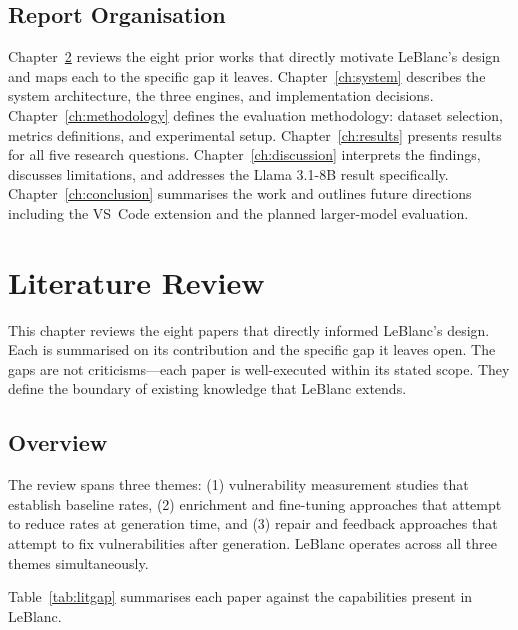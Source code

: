 \documentclass[12pt,a4paper]{report}
\begin{document}
\section{Report Organisation}
\label{sec:organisation}

Chapter~\ref{ch:literature} reviews the eight prior works that directly motivate
LeBlanc's design and maps each to the specific gap it leaves.
Chapter~\ref{ch:system} describes the system architecture, the three engines, and
implementation decisions.
Chapter~\ref{ch:methodology} defines the evaluation methodology: dataset
selection, metrics definitions, and experimental setup.
Chapter~\ref{ch:results} presents results for all five research questions.
Chapter~\ref{ch:discussion} interprets the findings, discusses limitations, and
addresses the Llama 3.1-8B result specifically.
Chapter~\ref{ch:conclusion} summarises the work and outlines future directions
including the VS~Code extension and the planned larger-model evaluation.

\chapter{Literature Review}
\label{ch:literature}

This chapter reviews the eight papers that directly informed LeBlanc's design.
Each is summarised on its contribution and the specific gap it leaves open.
The gaps are not criticisms---each paper is well-executed within its stated scope.
They define the boundary of existing knowledge that LeBlanc extends.

\section{Overview}
\label{sec:litoverview}

The review spans three themes: (1) vulnerability measurement studies that
establish baseline rates, (2) enrichment and fine-tuning approaches that attempt
to reduce rates at generation time, and (3) repair and feedback approaches that
attempt to fix vulnerabilities after generation. LeBlanc operates across all
three themes simultaneously.

Table~\ref{tab:litgap} summarises each paper against the capabilities present
in LeBlanc.
\end{document}
